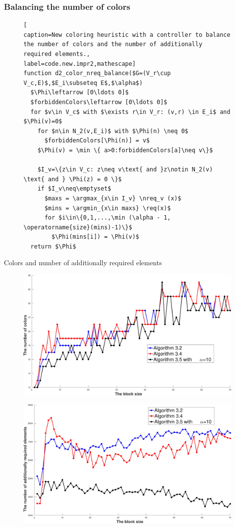 \documentclass{beamer}
\DeclareMathOperator*{\argmin}{arg\,min}
\DeclareMathOperator*{\argmax}{arg\,max}
\newcommand{\nreq}{L}
\newcommand{\req}{M}
\begin{document}
\begin{frame}[fragile]
\frametitle{Balancing the number of colors}
\begin{figure}
\begin{lstlisting}[
caption=New coloring heuristic with a controller to balance
the number of colors and the number of additionally required elements.,
label=code.new.impr2,mathescape]
function d2_color_nreq_balance($G=(V_r\cup V_c,E)$,$E_i\subseteq E$,$\alpha$)
  $\Phi\leftarrow [0\ldots 0]$
  $forbiddenColors\leftarrow [0\ldots 0]$
  for $v\in V_c$ with $\exists r\in V_r: (v,r) \in E_i$ and $\Phi(v)=0$
    for $n\in N_2(v,E_i)$ with $\Phi(n) \neq 0$
      $forbiddenColors[\Phi(n)] = v$
    $\Phi(v) = \min \{ a>0:forbiddenColors[a]\neq v\}$

    $I_v=\{z\in V_c: z\neq v\text{ and }z\notin N_2(v) \text{ and } \Phi(z) = 0 \}$
    if $I_v\neq\emptyset$
      $maxs = \argmax_{x\in I_v} \nreq_v (x)$
      $mins = \argmin_{x\in maxs} \req(x)$
      for $i\in\{0,1,...,\min (\alpha - 1, \operatorname{size}(mins)-1)\}$
        $\Phi(mins[i]) = \Phi(v)$
  return $\Phi$
\end{lstlisting}
\end{figure}
\end{frame}

\begin{frame}{Colors and number of additionally required elements}
\begin{figure}
\centering
\includegraphics[width=0.5\linewidth]{ex33_alg31_alg32_alg34_alg35_bls_lfo_cols}
\label{ex33_alg31_alg32_alg34_alg35_bls_lfo_cols}
\end{figure}

\begin{figure}
\centering
\includegraphics[width=0.5\linewidth]{ex33_alg31_alg32_alg34_alg35_bls_lfo_adds}
\label{ex33_alg31_alg32_alg34_alg35_bls_lfo_adds}
\end{figure}
\end{frame}
\end{document}
